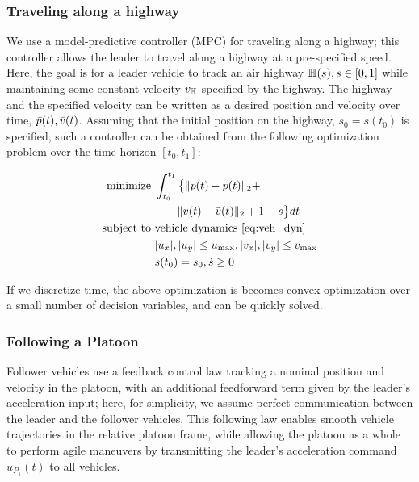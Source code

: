\subsubsection{Traveling along a highway} \label{sec:travel_hwy}
We use a model-predictive controller (MPC) for traveling along a highway; this controller allows the leader to travel along a highway at a pre-specified speed. Here, the goal is for a leader vehicle to track an air highway $\mathbb{H}(s), s\in[0,1]$ while maintaining some constant velocity $v_{\mathbb{H}}$ specified by the highway. The highway and the specified velocity can be written as a desired position and velocity over time, $\bar {p}(t), \bar {v} (t)$. Assuming that the initial position on the highway, $s_0=s(t_0)$ is specified, such a controller can be obtained from the following optimization problem over the time horizon $[t_0, t_1]$:

\begin{equation}
\begin{aligned}
\text{minimize } & \int_{t_0}^{t_1} \big\{\| p(t)-\bar{p}(t) \|_2 + \\ 
&\qquad \| v(t) - \bar{v}(t) \|_2 + 1-s \big\} dt \\
\text{subject to } & \text{vehicle dynamics } \eqref{eq:veh_dyn} \\
& |u_x|, |u_y| \le u_\text{max}, |v_x|, |v_y| \le v_\text{max} \\
& s(t_0) = s_0, \dot{s} \ge 0
\end{aligned}
\end{equation}

If we discretize time, the above optimization is becomes convex optimization over a small number of decision variables, and can be quickly solved.

\subsubsection{Following a Platoon} \label{sec:follow_platoon}
Follower vehicles use a feedback control law tracking a nominal position and velocity in the platoon, with an additional feedforward term given by the leader's acceleration input; here, for simplicity, we assume perfect communication between the leader and the follower vehicles. This following law enables smooth vehicle trajectories in the relative platoon frame, while allowing the platoon as a whole to perform agile maneuvers by transmitting the leader's acceleration command $u_{P_1}(t)$ to all vehicles.

